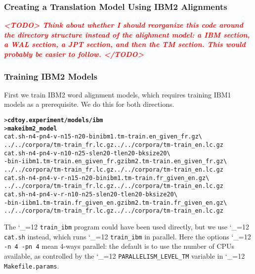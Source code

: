 \documentclass[11pt,letterpaper]{article}
\newcommand{\bs}{\textbackslash{}}
\newcommand{\TODO}[1]{\emph{\textbf{\textcolor{red}{<TODO> #1 </TODO>}}}}
\def\code{\begingroup\catcode`\_=12 \codex}
\newcommand{\codex}[1]{\texttt{#1}\endgroup}
\begin{document}
\subsubsection{Creating a Translation Model Using IBM2 Alignments} \label{IBM2}

\TODO{Think about whether I should reorganize this code around the directory
structure instead of the alighment model: a IBM section, a WAL section, a JPT
section, and then the TM section. This would probably be easier to follow.}

\subsubsection*{Training IBM2 Models}

First we train IBM2 word alignment models, which requires training IBM1 models
as a prerequisite.  We do this for both directions.
\begin{small}
\begin{alltt}
   > \textbf{cd toy.experiment/models/ibm}
   > \textbf{make ibm2_model}
   cat.sh -n 4 -pn 4 -v -n1 5 -n2 0 -bin ibm1.tm-train.en_given_fr.gz \bs
      ../../corpora/tm-train_fr.lc.gz ../../corpora/tm-train_en.lc.gz
   cat.sh -n 4 -pn 4 -v -n1 0 -n2 5 -slen 20 -tlen 20 -bksize 20 \bs
      -bin -i ibm1.tm-train.en_given_fr.gz ibm2.tm-train.en_given_fr.gz \bs
      ../../corpora/tm-train_fr.lc.gz ../../corpora/tm-train_en.lc.gz
   cat.sh -n 4 -pn 4 -v -r -n1 5 -n2 0 -bin ibm1.tm-train.fr_given_en.gz \bs
      ../../corpora/tm-train_fr.lc.gz ../../corpora/tm-train_en.lc.gz
   cat.sh -n 4 -pn 4 -v -r -n1 0 -n2 5 -slen 20 -tlen 20 -bksize 20 \bs
      -bin -i ibm1.tm-train.fr_given_en.gz ibm2.tm-train.fr_given_en.gz \bs
      ../../corpora/tm-train_fr.lc.gz ../../corpora/tm-train_en.lc.gz
\end{alltt}
\end{small}
The \code{train_ibm} program could have been used directly, but we use
\code{cat.sh} instead, which runs \code{train_ibm} in parallel. Here the
options \code{-n 4 -pn 4} mean 4-ways parallel: the default is to use the
number of CPUs available, as controlled by the \code{PARALLELISM_LEVEL_TM}
variable in \code{Makefile.params}.
\end{document}

